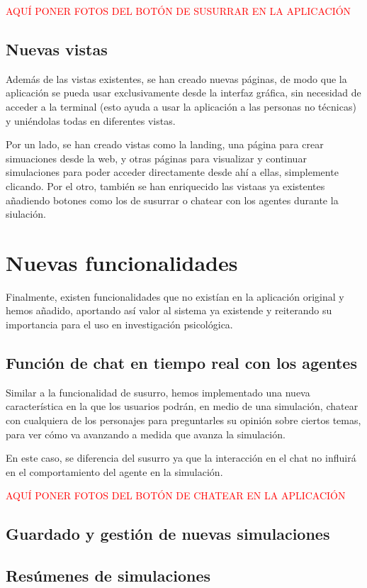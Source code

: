 \textcolor{red}{AQUÍ PONER FOTOS DEL BOTÓN DE SUSURRAR EN LA APLICACIÓN}

\subsection{Nuevas vistas}
Además de las vistas existentes, se han creado nuevas páginas, de modo que la aplicación se pueda usar exclusivamente desde la interfaz gráfica, sin necesidad de acceder a la terminal (esto ayuda a usar la aplicación a las personas no técnicas) y uniéndolas todas en diferentes vistas.

Por un lado, se han creado vistas como la landing, una página para crear simuaciones desde la web, y otras páginas para visualizar y continuar simulaciones para poder acceder directamente desde ahí a ellas, simplemente clicando. Por el otro, también se han enriquecido las vistaas ya existentes añadiendo botones como los de susurrar o chatear con los agentes durante la siulación.

\section{Nuevas funcionalidades}
Finalmente, existen funcionalidades que no existían en la aplicación original y hemos añadido, aportando así valor al sistema ya existende y reiterando su importancia para el uso en investigación psicológica.

\subsection{Función de chat en tiempo real con los agentes}
Similar a la funcionalidad de susurro, hemos implementado una nueva característica en la que los usuarios podrán, en medio de una simulación, chatear con cualquiera de los personajes para preguntarles su opinión sobre ciertos temas, para ver cómo va avanzando a medida que avanza la simulación.

En este caso, se diferencia del susurro ya que la interacción en el chat no influirá en el comportamiento del agente en la simulación.

\textcolor{red}{AQUÍ PONER FOTOS DEL BOTÓN DE CHATEAR EN LA APLICACIÓN}

\subsection{Guardado y gestión de nuevas simulaciones}

\subsection{Resúmenes de simulaciones}




























